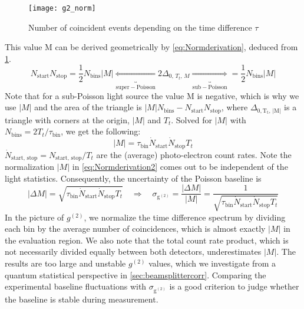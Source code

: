 \begin{figure}[htp]
	\centering
	\texttt{[image: g2\_norm]}
	\caption{Number of coincident events depending on the time difference $\tau$}
	\label{fig:Normtriangle}
\end{figure}
\noindent This value M can be derived geometrically by \cref{eq:Normderivation}, deduced from \cref{fig:Normtriangle}. 
\begin{equation}\label{eq:Normderivation}
	N_\mathrm{start}N_\mathrm{stop}=\dfrac{1}{2}N_\mathrm{bins}|M| \underbracket{\Leftarrow}_\mathrm{super-Poisson}2\Delta_{0,\, T_t,\, M}\underbracket{\Rightarrow}_\mathrm{sub-Poisson}=\dfrac{1}{2}N_\mathrm{bins}|M|
\end{equation}
Note that for a sub-Poisson light source the value M is negative, which is why we use $|M|$ and the area of the triangle is $|M|N_\mathrm{bins}-N_\mathrm{start}N_\mathrm{stop}$, where $\Delta_\mathrm{0,T_t,\,|M|}$ is a triangle with corners at the origin, $|M|$ and $T_t$. Solved for $|M|$ with $N_\mathrm{bins} = 2T_t/\tau_\mathrm{bin}$, we get the following:
\begin{equation}\label{eq:Normderivation2}
	|M|=\tau_\mathrm{bin}\dot{N}_\mathrm{start}\dot{N}_\mathrm{stop}T_t
\end{equation}
$\dot{N}_\mathrm{start,\, stop}= N_\mathrm{start,\, stop}/T_t$ are the (average) photo-electron count rates. Note the normalization $|M|$ in \cref{eq:Normderivation2} comes out to be independent of the light statistics. Consequently, the uncertainty of the Poisson baseline is
\begin{equation}\label{eq:Normderivation3}
	|\Delta M|=\sqrt{\tau_\mathrm{bin}\dot{N}_\mathrm{start}\dot{N}_\mathrm{stop}T_t}\quad\Rightarrow\quad\sigma_\mathrm{g^{(2)}}=\dfrac{|\Delta M|}{|M|}=\dfrac{1}{\sqrt{\tau_\mathrm{bin}\dot{N}_\mathrm{start}\dot{N}_\mathrm{stop}T_t}}
\end{equation}
In the picture of $g^{(2)}$, we normalize the time difference spectrum by dividing each bin by the average number of coincidences, which is almost exactly $|M|$ in the evaluation region. We also note that the total count rate product, which is not necessarily divided equally between both detectors, underestimates $|M|$. The results are too large and unstable $g^{(2)}$ values, which we investigate from a quantum statistical perspective in \cref{sec:beamsplittercorr}. Comparing the experimental baseline fluctuations with $\sigma_\mathrm{g^{(2)}}$ is a good criterion to judge whether the baseline is stable during measurement.

